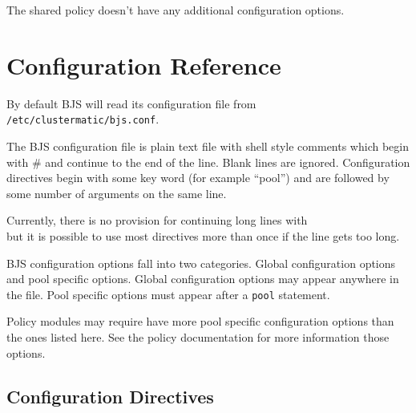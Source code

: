 \documentclass[oneside]{book}
\begin{document}
The shared policy doesn't have any additional configuration options.


\chapter{Configuration Reference}  %

By default BJS will read its configuration file from
\texttt{/etc/clustermatic/bjs.conf}.

The BJS configuration file is plain text file with shell style
comments which begin with \# and continue to the end of the line.
Blank lines are ignored.  Configuration directives begin with some key
word (for example ``pool'') and are followed by some number of
arguments on the same line.

Currently, there is no provision for continuing long lines with \\ but
it is possible to use most directives more than once if the line gets
too long.

BJS configuration options fall into two categories.  Global
configuration options and pool specific options.  Global configuration
options may appear anywhere in the file.  Pool specific options must
appear after a \texttt{pool} statement.

Policy modules may require have more pool specific configuration
options than the ones listed here.  See the policy documentation for
more information those options.

\section{Configuration Directives}
\end{document}
